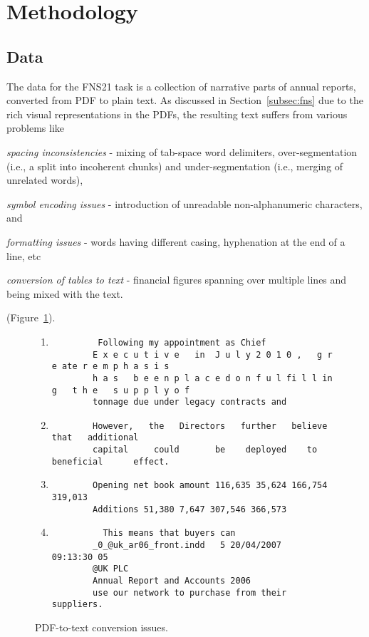 \section{Methodology}\label{sec:methodology}

\subsection{Data}\label{subsec:data}
The data for the FNS21 task is a collection of narrative parts of annual reports, converted from PDF to plain text.
As discussed in Section~\ref{subsec:fns} due to the rich visual representations in the PDFs, the resulting text suffers from various problems like
\begin{enumerate*}
    \item \emph{spacing inconsistencies} - mixing of tab-space word delimiters, over-segmentation (i.e., a split into incoherent chunks) and under-segmentation (i.e., merging of unrelated words),
    \item \emph{symbol encoding issues} - introduction of unreadable non-alphanumeric characters, and
    \item \emph{formatting issues} - words having different casing, hyphenation at the end of a line, etc
    \item \emph{conversion of tables to text} - financial figures spanning over multiple lines and being mixed with the text.
\end{enumerate*} (Figure~\ref{fig:pdf_to_text}).

\begin{figure}[ht]
    \centering
    \begin{enumerate}
        \item \begin{verbatim}
         Following my appointment as Chief
        E x e c u t i v e	in	J u l y	2 0 1 0 ,	g r e ate r	e m p h a s i s
        h a s	b e e n	p l a c e d	o n	f u l fi l l in g	t h e	s u p p l y	o f
        tonnage due under legacy contracts and
    \end{verbatim}
    \item \begin{verbatim}
        However,   the   Directors   further   believe   that   additional
        capital   	could   	be	  deployed	  to 	beneficial   	effect.
    \end{verbatim}
    \item \begin{verbatim}
        Opening net book amount 116,635 35,624 166,754 319,013
        Additions 51,380 7,647 307,546 366,573
    \end{verbatim}
    \item \begin{verbatim}
          This means that buyers can
        _0_@uk_ar06_front.indd   5 20/04/2007   09:13:30 05
        @UK PLC
        Annual Report and Accounts 2006
        use our network to purchase from their suppliers.
    \end{verbatim}
    \end{enumerate}
    \caption{PDF-to-text conversion issues.}
    \label{fig:pdf_to_text}
\end{figure}

